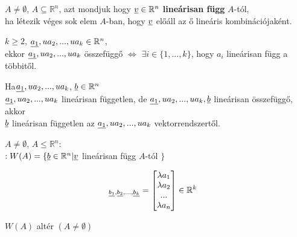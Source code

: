 	\begin{frame}
		\begin{tcolorbox}[title={Def.: Lineáris függőség}]
			$A \neq \emptyset$, $A \subseteq \mathbb{R}^n$, azt mondjuk hogy $\underline{v} \in \mathbb{R}^n$ \textbf{lineárisan függ} $A$-tól,\\
			ha létezik véges sok elem $A$-ban, hogy $\underline{v}$ előáll az ő lineáris kombinációjaként.
		\end{tcolorbox}
		
		\begin{tcolorbox}[title={Def.: Lineáris függőség}]
			$k \geq 2$, $\underline{a_1}, u{a_2}, ..., u{a_k} \in \mathbb{R}^n$,\\
			ekkor $\underline{a_1}, u{a_2}, ..., u{a_k}$ összefüggő $\iff$ $\exists i \in \{ 1, ..., k \}$, hogy $a_i$ lineárisan függ a többitől.
		\end{tcolorbox}
		
		\begin{tcolorbox}[title={Áll.: Lineáris függőség}]
			Ha$\underline{a_1}, u{a_2}, ..., u{a_k}$, $\underline{b} \in \mathbb{R}^n$\\		
			$\underline{a_1}, u{a_2}, ..., u{a_k}$ lineárisan független, de $\underline{a_1}, u{a_2}, ..., u{a_k}, \underline{b}$ lineárisan összefüggő, akkor\\
			$\underline{b}$ lineárisan független az $\underline{a_1}, u{a_2}, ..., u{a_k}$ vektorrendszertől.	
		\end{tcolorbox}
		
		\begin{tcolorbox}[title={Def.: Halmaz által generált altér / Lineáris Burok}]
			$A \neq \emptyset$, $A \leq \mathbb{R}^n$:\\
			$: W(A) = \{ \underline{b} \in \mathbb{R}^n | \underline{v}$ lineárisan függ $A$-tól $\}$
		\end{tcolorbox}
		
		\begin{tcolorbox}[title={Def.: Vektor koordinátái}]
			\begin{align}
				[a]_{\u{b_1}, \u{b_2}, ..., \u{b_k}} &= \begin{bmatrix}
					{\lambda}a_1 \\
					{\lambda}a_2 \\
					... \\
					{\lambda}a_n
				\end{bmatrix} \in \mathbb{R}^k
			\end{align}
		\end{tcolorbox}
		
		\begin{tcolorbox}[title={Tétel: Altér}]
			$W(A)$ altér $(A \neq \emptyset)$
		\end{tcolorbox}
	\end{frame}
	
